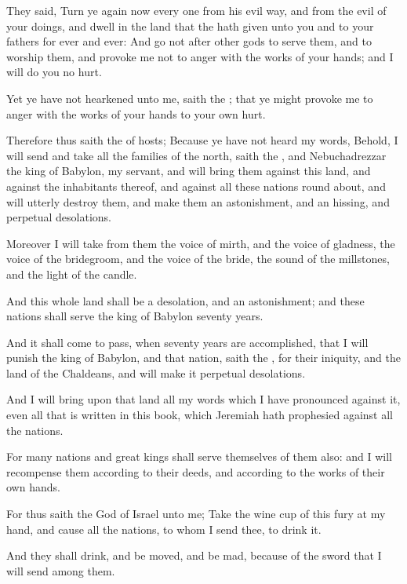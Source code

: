 \verse They said, Turn ye again now every one from his evil way, and from the evil of your doings, and dwell in the land that the \LORD hath given unto you and to your fathers for ever and ever: \verse And go not after other gods to serve them, and to worship them, and provoke me not to anger with the works of your hands; and I will do you no hurt.

\verse Yet ye have not hearkened unto me, saith the \LORD; that ye might provoke me to anger with the works of your hands to your own hurt.

\verse Therefore thus saith the \LORD of hosts; Because ye have not heard my words, \verse Behold, I will send and take all the families of the north, saith the \LORD, and Nebuchadrezzar the king of Babylon, my servant, and will bring them against this land, and against the inhabitants thereof, and against all these nations round about, and will utterly destroy them, and make them an astonishment, and an hissing, and perpetual desolations.

\verse Moreover I will take from them the voice of mirth, and the voice of gladness, the voice of the bridegroom, and the voice of the bride, the sound of the millstones, and the light of the candle.

\verse And this whole land shall be a desolation, and an astonishment; and these nations shall serve the king of Babylon seventy years.

\verse And it shall come to pass, when seventy years are accomplished, that I will punish the king of Babylon, and that nation, saith the \LORD, for their iniquity, and the land of the Chaldeans, and will make it perpetual desolations.

\verse And I will bring upon that land all my words which I have pronounced against it, even all that is written in this book, which Jeremiah hath prophesied against all the nations.

\verse For many nations and great kings shall serve themselves of them also: and I will recompense them according to their deeds, and according to the works of their own hands.

\verse For thus saith the \LORD God of Israel unto me; Take the wine cup of this fury at my hand, and cause all the nations, to whom I send thee, to drink it.

\verse And they shall drink, and be moved, and be mad, because of the sword that I will send among them.

